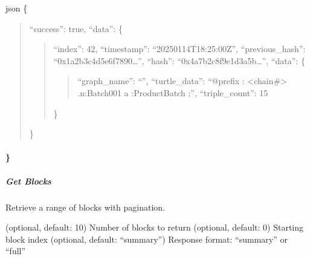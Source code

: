 \documentclass[letterpaper,10pt,english]{sphinxmanual}
\begin{document}
\sphinxAtStartPar
{}
{\color{red}\bfseries{}\textasciigrave{}\textasciigrave{}}{\color{red}\bfseries{}\textasciigrave{}}json
\{
\begin{quote}

\sphinxAtStartPar
“success”: true,
“data”: \{
\begin{quote}

\sphinxAtStartPar
“index”: 42,
“timestamp”: “2025\sphinxhyphen{}01\sphinxhyphen{}14T18:25:00Z”,
“previous\_hash”: “0x1a2b3c4d5e6f7890…”,
“hash”: “0x4a7b2c8f9e1d3a5b…”,
“data”: \{
\begin{quote}

\sphinxAtStartPar
“graph\_name”: “”,
“turtle\_data”: “@prefix : \textless{}\sphinxhyphen{}chain\#\textgreater{} .n:Batch001 a :ProductBatch ;”,
“triple\_count”: 15
\end{quote}

\sphinxAtStartPar
\}
\end{quote}

\sphinxAtStartPar
\}
\end{quote}


\paragraph{\}}
\label{\detokenize{api/rest-api:id43}}

\subparagraph{Get Blocks}
\label{\detokenize{api/rest-api:get-blocks}}
\sphinxAtStartPar
Retrieve a range of blocks with pagination.

\sphinxAtStartPar
{} 

\sphinxAtStartPar
{}
\sphinxhyphen{}  (optional, default: 10) \sphinxhyphen{} Number of blocks to return
\sphinxhyphen{}  (optional, default: 0) \sphinxhyphen{} Starting block index
\sphinxhyphen{}  (optional, default: “summary”) \sphinxhyphen{} Response format: “summary” or “full”
\end{document}
